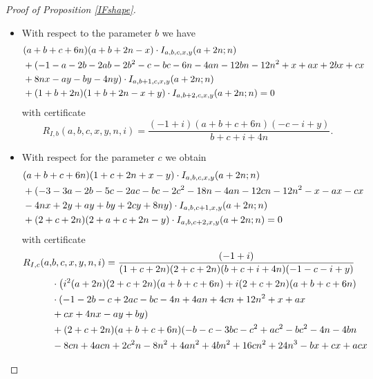\documentclass{amsart}
\numberwithin{equation}{section}
\begin{document}
\begin{proof}[Proof of Proposition \ref{IFshape}]
\begin{itemize}
        \item With respect to the parameter $b$ we have
        \begin{align}
            &(a + b + c + 6 n) (a + b + 2 n - x)\cdot I_{a,b,c,x,y}(a+2n;n)\hphantom{a} \label{brec}\\
            &+(-1 - a - 2 b - 2 a b - 2 b^2 - c - b c - 6 n - 4 a n - 12 b n - 
  12 n^2 + x + a x + 2 b x + c x  \hphantom{a}\notag\\
            &+8 n x - a y - b y - 4 n y)\cdot I_{a,b+1,c,x,y}(a+2n;n)\hphantom{a}\notag\\
            &+(1 + b + 2 n) (1 + b + 2 n - x + y)\cdot I_{a,b+2,c,x,y}(a+2n;n)=0\notag
        \end{align}
        with certificate
        \[R_{I,b}(a,b,c,x,y,n,i)=\frac{(-1 + i) (a + b + c + 6 n) (-c - i + y)}{b + c + i + 4 n}.\]
        \item With respect for the parameter $c$ we obtain
        \begin{align}
            &(a + b + c + 6 n) (1 + c + 2 n + x - y)\cdot I_{a,b,c,x,y}(a+2n;n)\hphantom{a}\\
            &+(-3 - 3 a - 2 b - 5 c - 2 a c - b c - 2 c^2 - 18 n - 4 a n - 12 c n - 
  12 n^2 - x - a x - c x \notag\\
            &- 4 n x +2 y + a y + b y + 2 c y + 8 n y)\cdot I_{a,b,c+1,x,y}(a+2n;n)\hphantom{a}\notag\\
            &+(2 + c + 2 n) (2 + a + c + 2 n - y)\cdot I_{a,b,c+2,x,y}(a+2n;n)=0\notag
        \end{align}
        with certificate 
        \begin{align}
            R_{I,c}(a,&b,c,x,y,n,i)=\frac{(-1+i)}{(1 + c + 2 n) (2 + c + 2 n) (b + c + i + 4 n) (-1 - c - i + y)}\notag\\
            &\cdot\big(i^2 (a + 2 n) (2 + c + 2 n) (a + b + c + 6 n) + 
            i (2 + c + 2 n) (a + b + c + 6 n) \notag\\
            &\cdot(-1 - 2 b - c + 2 a c - b c - 
            4 n + 4 a n + 4 c n + 12 n^2 + x + a x \notag\\
            &+ c x + 4 n x - a y + 
            b y) \notag\\
            &+ (2 + c + 2 n) (a + b + c + 6 n) (-b - c - 3 b c - c^2 + 
            a c^2 - b c^2 - 4 n - 4 b n \notag\\
            &- 8 c n + 4 a c n + 2 c^2 n - 8 n^2 + 
            4 a n^2 + 4 b n^2 + 16 c n^2 + 24 n^3 - b x + c x + a c x \notag\\

\end{align}
\end{itemize}
\end{proof}
\end{document}
